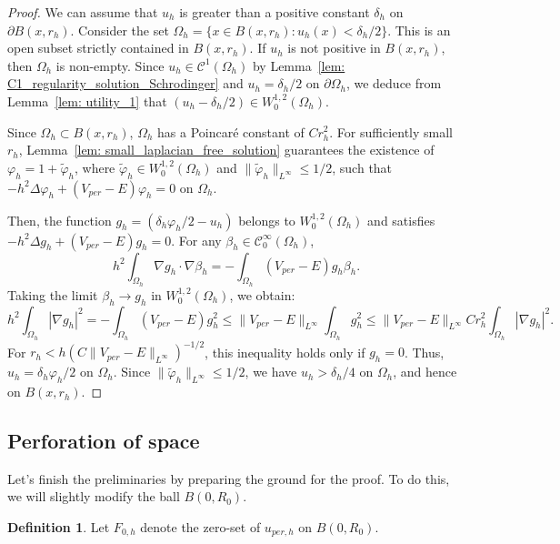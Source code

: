 \documentclass[leqno,11pt,letterpaper, english]{amsart}
\theoremstyle{plain}
\theoremstyle{definition}
\newtheorem{defn}[prop]{Definition}
\numberwithin{equation}{section}
\begin{document}
\begin{proof}
We can assume that $u_h$ is greater than a positive constant $\delta_h$ on $\partial B(x, r_h)$. Consider the set $\Omega_h = \{x \in B(x, r_h) : u_h(x) < \delta_h/2\}$. This is an open subset strictly contained in $B(x, r_h)$. If $u_h$ is not positive in $B(x, r_h)$, then $\Omega_h$ is non-empty. Since $u_h \in \mathcal{C}^1(\Omega_h)$ by Lemma~\ref{lem: C1_regularity_solution_Schrodinger} and $u_h = \delta_h/2$ on $\partial \Omega_h$, we deduce from Lemma~\ref{lem: utility_1} that $(u_h - \delta_h/2) \in W_0^{1,2}(\Omega_h)$.

Since $\Omega_h \subset B(x, r_h)$, $\Omega_h$ has a Poincaré constant of $C r_h^2$. For sufficiently small $r_h$, Lemma~\ref{lem: small_laplacian_free_solution} guarantees the existence of $\varphi_h = 1 + \tilde{\varphi}_h$, where $\tilde{\varphi}_h \in W_0^{1,2}(\Omega_h)$ and $\|\tilde{\varphi}_h\|_{L^\infty} \leq 1/2$, such that $-h^2\Delta \varphi_h + (V_{per} - E)\varphi_h = 0$ on $\Omega_h$.

Then, the function $g_h = (\delta_h \varphi_h/2 - u_h)$ belongs to $W_0^{1,2}(\Omega_h)$ and satisfies $-h^2\Delta g_h + (V_{per} - E)g_h = 0$. For any $\beta_h \in \mathcal{C}_0^\infty(\Omega_h)$,
\[
h^2 \int_{\Omega_h} \nabla g_h \cdot \nabla \beta_h = - \int_{\Omega_h} (V_{per} - E) g_h \beta_h.
\]
Taking the limit $\beta_h \rightarrow g_h$ in $W_0^{1,2}(\Omega_h)$, we obtain:
\[
h^2 \int_{\Omega_h} |\nabla g_h|^2 = - \int_{\Omega_h} (V_{per}-E) g_h^2 \leq \|V_{per} - E\|_{L^\infty} \int_{\Omega_h} g_h^2 \leq \|V_{per} - E\|_{L^\infty} C r_h^2 \int_{\Omega_h} |\nabla g_h|^2.
\]
For $r_h < h (C \|V_{per} - E\|_{L^\infty})^{-1/2}$, this inequality holds only if $g_h = 0$. Thus, $u_h = \delta_h \varphi_h/2$ on $\Omega_h$. Since $\|\tilde{\varphi}_h\|_{L^\infty} \leq 1/2$, we have $u_h > \delta_h/4$ on $\Omega_h$, and hence on $B(x, r_h)$.
\end{proof}



\subsection{Perforation of space}
\label{sect: decoupespace}
Let's finish the preliminaries by preparing the ground for the proof. To do this, we will slightly modify the ball $B(0,R_0)$. 
\begin{defn}
Let $F_{0,h}$ denote the zero-set of $u_{per,h}$ on $B(0, R_0)$.
\end{defn}
\end{document}

